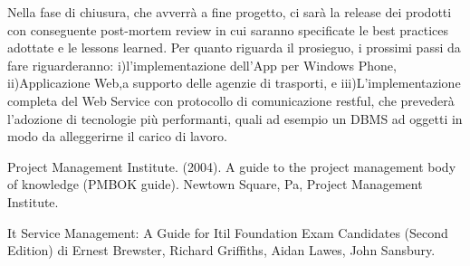 \documentclass[conference]{IEEEtran}
\begin{document}
Nella fase di chiusura, che avverrà a fine progetto, ci sarà la release dei prodotti con conseguente post-mortem review in cui saranno specificate le best practices adottate e le lessons learned.
Per quanto riguarda il prosieguo, i prossimi passi da fare riguarderanno: i)l\rq implementazione dell\rq App per Windows Phone, ii)Applicazione Web,a supporto delle agenzie di trasporti, e iii)L’implementazione completa del Web Service con protocollo di comunicazione restful, che preveder\`{a} l\rq adozione di tecnologie più performanti, quali ad esempio un DBMS ad oggetti in modo da alleggerirne il carico di lavoro.




\begin{thebibliography}{1}

Project Management Institute. (2004). A guide to the project management body of knowledge (PMBOK guide). Newtown Square, Pa, Project Management Institute.

It Service Management: A Guide for Itil Foundation Exam Candidates (Second Edition) di Ernest Brewster, Richard Griffiths, Aidan Lawes, John Sansbury.


\end{thebibliography}




\end{document}

